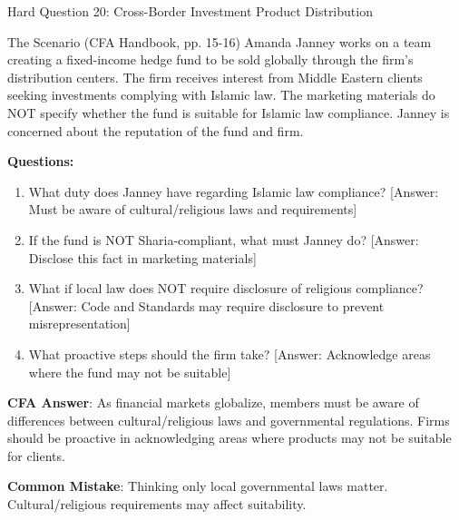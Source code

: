 \documentclass{beamer}
\begin{document}
	\begin{frame}{Hard Question 20: Cross-Border Investment Product Distribution}
		\begin{block}{The Scenario (CFA Handbook, pp. 15-16)}
			Amanda Janney works on a team creating a fixed-income hedge fund to be sold globally through the firm's distribution centers. The firm receives interest from Middle Eastern clients seeking investments complying with Islamic law. The marketing materials do NOT specify whether the fund is suitable for Islamic law compliance. Janney is concerned about the reputation of the fund and firm.
		\end{block}
		
		\vspace{0.2cm}
		\textbf{Questions:}
		\begin{enumerate}
			\item What duty does Janney have regarding Islamic law compliance? \textcolor{cfared}{[Answer: Must be aware of cultural/religious laws and requirements]}
			\item If the fund is NOT Sharia-compliant, what must Janney do? \textcolor{cfared}{[Answer: Disclose this fact in marketing materials]}
			\item What if local law does NOT require disclosure of religious compliance? \textcolor{cfared}{[Answer: Code and Standards may require disclosure to prevent misrepresentation]}
			\item What proactive steps should the firm take? \textcolor{cfared}{[Answer: Acknowledge areas where the fund may not be suitable]}
		\end{enumerate}
		
		\vspace{0.2cm}
		\textcolor{cfablue}{\textbf{CFA Answer}}: As financial markets globalize, members must be aware of differences between cultural/religious laws and governmental regulations. Firms should be proactive in acknowledging areas where products may not be suitable for clients.
		
		\vspace{0.1cm}
		\textcolor{cfared}{\textbf{Common Mistake}}: Thinking only local governmental laws matter. Cultural/religious requirements may affect suitability.
	\end{frame}
	
\end{document}
